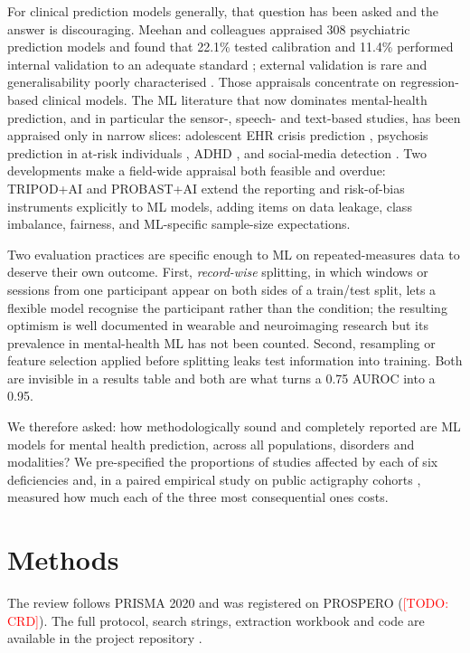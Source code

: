 \documentclass[11pt,a4paper]{article}
\newcommand{\todo}[1]{\textcolor{red}{[TODO: #1]}}
\begin{document}
For clinical prediction models generally, that question has been asked and the answer is
discouraging. Meehan and colleagues appraised 308 psychiatric prediction models and found that
22.1\% tested calibration and 11.4\% performed internal validation to an adequate standard
\cite{meehan2022}; external validation is rare and generalisability poorly characterised
\cite{molpsych2025}. Those appraisals concentrate on regression-based clinical models. The ML
literature that now dominates mental-health prediction, and in particular the sensor-, speech-
and text-based studies, has been appraised only in narrow slices: adolescent EHR crisis prediction
\cite{adolescentehr2025}, psychosis prediction in at-risk individuals \cite{psychosisarms}, ADHD
\cite{adhd2024}, and social-media detection \cite{socialmedia2024}. Two developments make a
field-wide appraisal both feasible and overdue: TRIPOD+AI \cite{collins2024} and PROBAST+AI
\cite{moons2025} extend the reporting and risk-of-bias instruments explicitly to ML models,
adding items on data leakage, class imbalance, fairness, and ML-specific sample-size expectations.

Two evaluation practices are specific enough to ML on repeated-measures data to deserve their own
outcome. First, \emph{record-wise} splitting, in which windows or sessions from one participant
appear on both sides of a train/test split, lets a flexible model recognise the participant rather
than the condition; the resulting optimism is well documented in wearable and neuroimaging
research \cite{saeb2017,jmirai2026} but its prevalence in mental-health ML has not been counted.
Second, resampling or feature selection applied before splitting leaks test information into
training. Both are invisible in a results table and both are what turns a 0.75 AUROC into a 0.95.

We therefore asked: how methodologically sound and completely reported are ML models for mental
health prediction, across all populations, disorders and modalities? We pre-specified the
proportions of studies affected by each of six deficiencies and, in a paired empirical study on
public actigraphy cohorts \cite{paperB}, measured how much each of the three most consequential
ones costs.

\section{Methods}
The review follows PRISMA 2020 \cite{page2021} and was registered on PROSPERO (\todo{CRD}). The
full protocol, search strings, extraction workbook and code are available in the project
repository \cite{repo}.
\end{document}
